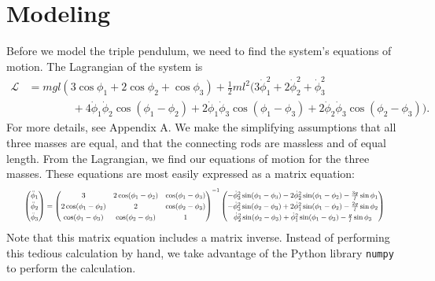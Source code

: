 \documentclass{article}
\renewcommand{\L}{\mathcal{L}}
\begin{document}
\section{Modeling}
Before we model the triple pendulum, we need to find the system's 
equations of motion.  The Lagrangian of the system is
\begin{align}
    \L &=  mgl\left(3\cos\phi_1+2\cos\phi_2+\cos\phi_3 \right) 
	   + \frac{1}{2}ml^2 \bigl( 3\dot\phi_1^2+2\dot\phi_2^2+\dot\phi_3^2 \\
	   &\qquad\qquad + 4\dot\phi_1\dot\phi_2\cos(\phi_1-\phi_2)   
	   + 2\dot\phi_1\dot\phi_3\cos(\phi_1-\phi_3)
	   + 2\dot\phi_2\dot\phi_3\cos(\phi_2-\phi_3) \bigr). 
\end{align}
For more details, see Appendix A. 
We make the simplifying assumptions that all three masses
are equal, and that the connecting rods are massless and of equal length.
From the Lagrangian, we find our equations of motion for the three masses. 
These equations are most easily expressed as a matrix equation:
\begingroup 
\begin{equation} \renewcommand*{\arraystretch}{1.25} 
	\resizebox{0.95\textwidth}{!}{$
	\begin{pmatrix}
		\ddot\phi_1 \\
		\ddot\phi_2 \\
		\ddot\phi_3
	\end{pmatrix} =
	\begin{pmatrix}
		3                    & 2\cos(\phi_1-\phi_2) & \cos(\phi_1-\phi_3) \\
		2\cos(\phi_1-\phi_2) & 2                    & \cos(\phi_2-\phi_3) \\
		\cos(\phi_1-\phi_3)  & \cos(\phi_2-\phi_3)  & 1                   \\
	\end{pmatrix}^{-1}
	\begin{pmatrix}
		-\dot\phi_3^2\sin(\phi_1-\phi_3) -2\dot\phi_2^2\sin(\phi_1-\phi_2)
			-\frac{3g}{l}\sin\phi_1 \\
		-\dot\phi_3^2\sin(\phi_2-\phi_3) + 2\dot\phi_1^2\sin(\phi_1-\phi_2)
			-\frac{2g}{l}\sin\phi_2 \\
		\dot\phi_2^2\sin(\phi_2-\phi_3) + \dot\phi_1^2\sin(\phi_1-\phi_3)
			-\frac{g}{l}\sin\phi_3
	\end{pmatrix}
	$} 
\end{equation} 
\endgroup 
Note that this matrix equation includes a matrix inverse. Instead of 
performing this tedious calculation by hand, we take advantage of the 
Python library \texttt{numpy} to perform the calculation. 
\end{document}
